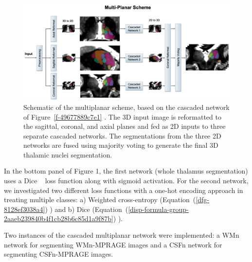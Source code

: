 \documentclass[3p,,final,12pt]{elsarticle}
\begin{document}
\begin{figure}[!htbp]
\centering \includegraphics{Thalamus/images/slide2.jpeg}
\caption{Schematic of the multiplanar scheme, based on the cascaded network of Figure~\ref{f-49677889c7e1} . The 3D input image is reformatted to the sagittal, coronal, and axial planes and fed as 2D inputs to three separate cascaded networks. The segmentations from the three 2D networks are fused using majority voting to generate the final 3D thalamic nuclei segmentation. }
\label{f-afc126ad9a6a}
\end{figure}

In the bottom panel of Figure 1, the first network (whole thalamus segmentation) uses a Dice \unskip~\cite{1643371:26789956} loss function along with sigmoid activation. For the second network, we investigated two different loss functions with a one-hot encoding approach in treating multiple classes: a) Weighted cross-entropy (Equation~(\ref{dfg-8128ef3038a4}) ) and b) Dice (Equation~(\ref{disp-formula-group-2aaeb239840b4f1cb28b6c85d1a9f87b}) ).

Two instances of the cascaded multiplanar network were implemented: a WMn network for segmenting WMn-MPRAGE images and a CSFn network for segmenting CSFn-MPRAGE images.
\end{document}
